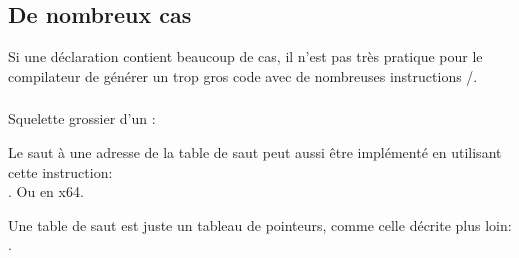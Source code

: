 \subsection{De nombreux cas}

Si une déclaration  contient beaucoup de cas, il n'est pas très pratique
pour le compilateur de générer un trop gros code avec de nombreuses instructions
\JE/\JNE.







\subsubsection{\Conclusion{}}

Squelette grossier d'un :



Le saut à une adresse de la table de saut peut aussi être implémenté en utilisant
cette instruction: \\
.
Ou  en x64.

Une table de saut est juste un tableau de pointeurs, comme celle décrite plus
loin: . 
